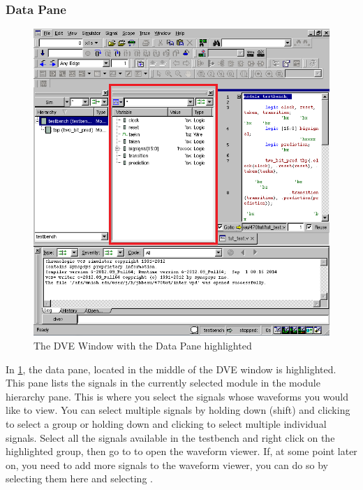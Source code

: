 \documentclass[dvipsnames]{article}
\begin{document}
\subsubsection{Data Pane}
\begin{figure}[H]
	\includegraphics[width=\textwidth]{data-pane}
	\caption{The DVE Window with the Data Pane highlighted}
	\label{fig:data-pane}
\end{figure}

In \cref{fig:data-pane}, the data pane, located in the middle of the DVE window
is highlighted. This pane lists the signals in the currently selected module in
the module hierarchy pane. This is where you select the signals whose waveforms 
you would like to view. You can select multiple signals by holding down \keys{\shift}(shift) and clicking to select a group
or holding down \keys{\ctrl} and clicking to select multiple individual
signals. Select all the signals available in the testbench and right click on
the highlighted group, then go to  to open the
waveform viewer. If, at some point later on, you need to add more signals to the
waveform viewer, you can do so by selecting them here and selecting 
.
\end{document}
